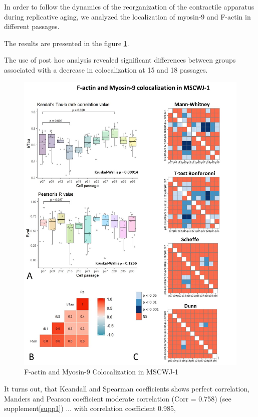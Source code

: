\documentclass[english,authoryear]{elsarticle}
\begin{document}
In order to follow the dynamics of the reorganization of the contractile apparatus during replicative aging, we analyzed the localization of myosin-9 and F-actin in different passages.

The results are presented in the figure \ref{m9-actin-col}.

The use of post hoc analysis revealed significant differences between groups associated with a decrease in colocalization at 15 and 18 passages.


\begin{figure}[hbt!]
\centering
\includegraphics[width=0.9\linewidth]{fig_m9-actin-col.jpg}
\caption{F-actin and Myosin-9 Colocalization in MSCWJ-1}
\label{m9-actin-col}
\end{figure}



It turns out, that Keandall and Spearman coefficients shows perfect correlation, Manders and Pearson coefficient moderate correlation (Corr = 0.758) (see supplement\ref{supp1}) ... with correlation coefficient 0.985,
\end{document}
